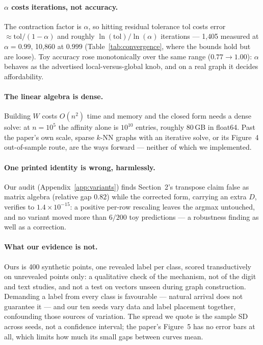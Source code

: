 \paragraph{$\alpha$ costs iterations, not accuracy.}
The contraction factor is $\alpha$, so hitting residual tolerance
$\mathrm{tol}$ costs error $\approx\mathrm{tol}/(1-\alpha)$ and roughly
$\ln(\mathrm{tol})/\ln(\alpha)$ iterations --- 1{,}405 measured at $\alpha=0.99$,
10{,}860 at $0.999$ (Table~\ref{tab:convergence}, where the bounds hold but are
loose). Toy accuracy rose monotonically over the same range
($0.77\to1.00$): $\alpha$ behaves as the advertised local-versus-global knob, and
on a real graph it decides affordability.

\paragraph{The linear algebra is dense.}
Building $W$ costs $O(n^{2})$ time and memory and the closed form needs a dense
solve: at $n=10^{5}$ the affinity alone is $10^{10}$ entries, roughly 80\,GB in
float64. Past the paper's own scale, sparse $k$-NN graphs with an iterative
solve, or its Figure~4 out-of-sample route, are the ways forward --- neither of
which we implemented.

\paragraph{One printed identity is wrong, harmlessly.}
Our audit (Appendix~\ref{app:variants}) finds Section~2's transpose claim false
as matrix algebra (relative gap $0.82$) while the corrected form, carrying an
extra $D$, verifies to $1.4\times10^{-15}$: a positive per-row rescaling leaves
the argmax untouched, and no variant moved more than $6/200$ toy predictions ---
a robustness finding as well as a correction.

\paragraph{What our evidence is not.}
Ours is 400 synthetic points, one revealed label per class, scored transductively
on unrevealed points only: a qualitative check of the mechanism, not of the digit
and text studies, and not a test on vectors unseen during graph construction.
Demanding a label from every class is favourable --- natural arrival does not
guarantee it --- and our ten seeds vary data and label placement together,
confounding those sources of variation. The spread we quote is the sample SD
across seeds, not a confidence interval; the paper's Figure~5 has no error bars
at all, which limits how much its small gaps between curves mean.
